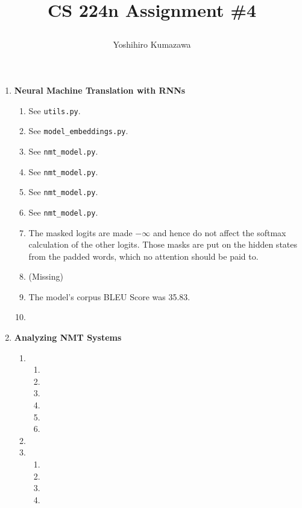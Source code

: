 \documentclass[12pt]{article}
\title{
  \vspace{-2cm}
  CS 224n Assignment \#4 \\
  \author{Yoshihiro Kumazawa}
}
\begin{document}
\maketitle
\begin{enumerate}[label=\textbf{\arabic*.}]
  \item \textbf{Neural Machine Translation with RNNs}
  \begin{enumerate}[label=(\alph*)]
    \item See \texttt{utils.py}.
    \item See \texttt{model\_embeddings.py}.
    \item See \texttt{nmt\_model.py}.
    \item See \texttt{nmt\_model.py}.
    \item See \texttt{nmt\_model.py}.
    \item See \texttt{nmt\_model.py}.
    \item The masked logits are made $-\infty$ and hence do not affect the softmax calculation of the other logits. Those masks are put on the hidden states from the padded words, which no attention should be paid to.
    \item (Missing)
    \item The model’s corpus BLEU Score was 35.83.
    \item
  \end{enumerate}
  \item \textbf{Analyzing NMT Systems}
  \begin{enumerate}[label=(\alph*)]
    \item
    \begin{enumerate}[label=\roman*.]
      \item
      \item
      \item
      \item
      \item
      \item
    \end{enumerate}
    \item
    \item
    \begin{enumerate}[label=\roman*.]
      \item
      \item
      \item
      \item
    \end{enumerate}
  \end{enumerate}
\end{enumerate}
\end{document}
